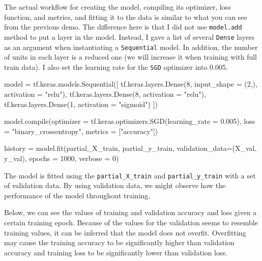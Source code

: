 \documentclass[
  letterpaper,
  DIV=11,
  numbers=noendperiod]{scrreprt}
\newenvironment{Shaded}{\begin{snugshade}}{\end{snugshade}}
\newcommand{\BuiltInTok}[1]{\textcolor[rgb]{0.00,0.23,0.31}{#1}}
\newcommand{\DecValTok}[1]{\textcolor[rgb]{0.68,0.00,0.00}{#1}}
\newcommand{\FloatTok}[1]{\textcolor[rgb]{0.68,0.00,0.00}{#1}}
\newcommand{\NormalTok}[1]{\textcolor[rgb]{0.00,0.23,0.31}{#1}}
\newcommand{\OperatorTok}[1]{\textcolor[rgb]{0.37,0.37,0.37}{#1}}
\newcommand{\StringTok}[1]{\textcolor[rgb]{0.13,0.47,0.30}{#1}}
\begin{document}
The actual workflow for creating the model, compiling its optimizer,
loss function, and metrics, and fitting it to the data is similar to
what you can see from the previous demo. The difference here is that I
did not use \texttt{model.add} method to put a layer in the model.
Instead, I gave a list of several \texttt{Dense} layers as an argument
when instantiating a \texttt{Sequential} model. In addition, the number
of units in each layer is a reduced one (we will increase it when
training with full train data). I also set the learning rate for the
\texttt{SGD} optimizer into 0.005.

\begin{Shaded}
\begin{Highlighting}[]
\NormalTok{model }\OperatorTok{=}\NormalTok{ tf.keras.models.Sequential([}
\NormalTok{    tf.keras.layers.Dense(}\DecValTok{8}\NormalTok{, input\_shape }\OperatorTok{=}\NormalTok{ (}\DecValTok{2}\NormalTok{,), activation }\OperatorTok{=} \StringTok{"relu"}\NormalTok{),}
\NormalTok{    tf.keras.layers.Dense(}\DecValTok{8}\NormalTok{, activation }\OperatorTok{=} \StringTok{"relu"}\NormalTok{),}
\NormalTok{    tf.keras.layers.Dense(}\DecValTok{1}\NormalTok{, activation }\OperatorTok{=} \StringTok{"sigmoid"}\NormalTok{)}
\NormalTok{])}

\NormalTok{model.}\BuiltInTok{compile}\NormalTok{(optimizer }\OperatorTok{=}\NormalTok{ tf.keras.optimizers.SGD(learning\_rate }\OperatorTok{=} \FloatTok{0.005}\NormalTok{), }
\NormalTok{              loss }\OperatorTok{=} \StringTok{"binary\_crossentropy"}\NormalTok{,}
\NormalTok{              metrics }\OperatorTok{=}\NormalTok{ [}\StringTok{"accuracy"}\NormalTok{])}

\NormalTok{history }\OperatorTok{=}\NormalTok{ model.fit(partial\_X\_train, }
\NormalTok{                    partial\_y\_train, }
\NormalTok{                    validation\_data}\OperatorTok{=}\NormalTok{(X\_val, y\_val), }
\NormalTok{                    epochs }\OperatorTok{=} \DecValTok{1000}\NormalTok{, }
\NormalTok{                    verbose }\OperatorTok{=} \DecValTok{0}\NormalTok{)}
\end{Highlighting}
\end{Shaded}

The model is fitted using the \texttt{partial\_X\_train} and
\texttt{partial\_y\_train} with a set of validation data. By using
validation data, we might observe how the performance of the model
throughout training.

Below, we can see the values of training and validation accuracy and
loss given a certain training epoch. Because of the values for the
validation seems to resemble training values, it can be inferred that
the model does not overfit. Overfitting may cause the training accuracy
to be significantly higher than validation accuracy and training loss to
be significantly lower than validation loss.
\end{document}
